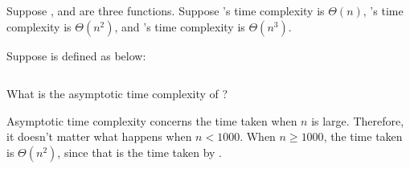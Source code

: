 \Needspace{3in}
\begin{prob}
    Suppose ,  and  are three functions.
    Suppose 's time complexity is $\Theta(n)$, 's
    time complexity is $\Theta(n^2)$, and 's
    time complexity is $\Theta(n^3)$.

    Suppose  is defined as below:

    \inputminted{python}{\thisdir/code.py}

    What is the asymptotic time complexity of ?


    \begin{soln}
        Asymptotic time complexity concerns the time taken when $n$ is large.
        Therefore, it doesn't matter what happens when $n < 1000$.
        When $n \geq 1000$, the time taken is $\Theta(n^2)$, since that is the
        time taken by .
    \end{soln}
\end{prob}
